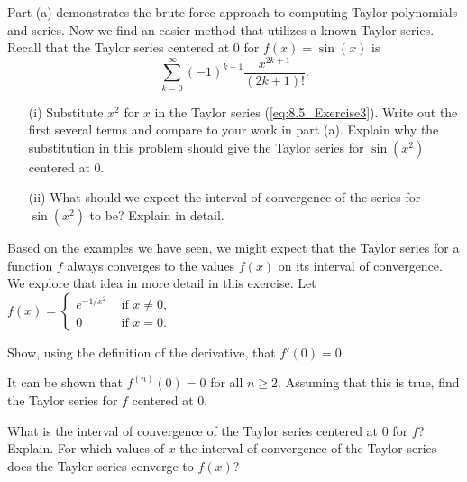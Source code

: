 \begin{exercises}
    \item Part (a) demonstrates the brute force approach to computing Taylor polynomials and series. Now we find an easier method that utilizes a known Taylor series. Recall that the Taylor series centered at 0 for $f(x) = \sin(x)$ is
    \begin{equation} \label{eq:8.5_Exercise3}
    \sum_{k=0}^{\infty} (-1)^{k+1} \frac{x^{2k+1}}{(2k+1)!}.
    \end{equation}
        \begin{itemize}
        \item[(i)] Substitute $x^2$ for $x$ in the Taylor series (\ref{eq:8.5_Exercise3}). Write out the first several terms and compare to your work in part (a). Explain why the substitution in this problem should give the Taylor series for $\sin(x^2)$ centered at 0.

        \item[(ii)] What should we expect the interval of convergence of the series for $\sin(x^2)$ to be? Explain in detail.

        \end{itemize}
    \ea
    
    \item Based on the examples we have seen, we might expect that the Taylor series for a function $f$ always converges to the values $f(x)$ on its interval of convergence. We explore that idea in more detail in this exercise. Let $f(x) =
    \begin{cases}
    e^{-1/x^2} &\text{ if } x \neq 0, \\
    0   &\text{ if } x = 0.
    \end{cases}$
    \ba
    \item Show, using the definition of the derivative, that $f'(0) = 0$.
    \item It can be shown that $f^{(n)}(0) = 0$ for all $n \geq 2$. Assuming that this is true, find the Taylor series for $f$ centered at 0.
    \item What is the interval of convergence of the Taylor series centered at 0 for $f$? Explain. For which values of $x$ the interval of convergence of the Taylor series does the Taylor series converge to $f(x)$?
    \ea

\end{exercises}


\afterexercises
